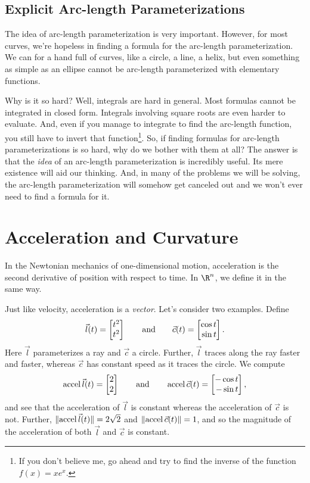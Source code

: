 \subsection{Explicit Arc-length Parameterizations}
The idea of arc-length parameterization is very important.  However, for most curves,
we're hopeless in finding a formula for the arc-length parameterization.  We can for a hand
full of curves, like a circle, a line, a helix, but even something as simple as an ellipse
cannot be arc-length parameterized with elementary functions.

Why is it so hard?  Well, integrals are hard in general.  Most formulas cannot be integrated in closed
form.  Integrals involving square roots are even harder to evaluate.  And, even if you manage
to integrate to find the arc-length function, you still have to invert that function\footnote{ If you don't
believe me, go ahead and 
try to find the inverse of the function $f(x)=xe^x$. }.  So, if finding formulas for arc-length parameterizations
is so hard, why do we bother with them at all?  The answer is that the \emph{idea} of an arc-length parameterization
is incredibly useful. Its mere existence will aid our thinking.  And, in many of the problems we will be solving,
the arc-length parameterization will somehow get canceled out and we won't ever need to find a formula for it.

\begin{exercises}
\end{exercises}

\section{Acceleration and Curvature}
In the Newtonian mechanics of one-dimensional motion, acceleration is the second
derivative of position with respect to time.  In $\R^n$, we define it in the same way.

\DefAcceleration

Just like velocity, acceleration is a \emph{vector}.  Let's consider two examples.  Define
\[
	\vec l(t) = \mat{t^2\\t^2}\qquad\text{and}\qquad\vec c(t) = \mat{\cos t\\\sin t}.
\]
Here $\vec l$ parameterizes a ray and $\vec c$ a circle.  Further, $\vec l$ traces along the ray
faster and faster, whereas $\vec c$ has constant speed as it traces the circle.
We compute 
\[
	\Accel \vec l(t) = \mat{2\\2}\qquad\text{and}\qquad \Accel\vec c(t) = \mat{-\cos t\\ -\sin t},
\]
and see that the acceleration of $\vec l$ is constant whereas the acceleration of $\vec c$ is not.  Further,
$\lVert\operatorname{accel} \vec l(t)\rVert=2\sqrt{2}$ and $\lVert\operatorname{accel} \vec c(t)\rVert=1$, and so the magnitude of the acceleration of
both $\vec l$ and $\vec c$ is constant.

